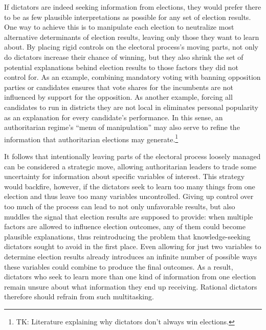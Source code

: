 \documentclass[12pt]{article}
\newcommand{\1}{\mathbbm{1}}
\begin{document}
If dictators are indeed seeking information from elections, they would prefer there to be as few plausible interpretations as possible for any set of election results. One way to achieve this is to manipulate each election to neutralize most alternative determinants of election results, leaving only those they want to learn about. By placing rigid controls on the electoral process's moving parts, not only do dictators increase their chance of winning, but they also shrink the set of potential explanations behind election results to those factors they did not control for. As an example, combining mandatory voting with banning opposition parties or candidates ensures that vote shares for the incumbents are not influenced by support for the opposition. As another example, forcing all candidates to run in districts they are not local in eliminates personal popularity as an explanation for every candidate's performance. In this sense, an authoritarian regime's ``menu of manipulation'' \citep{Schedler2002menu} may also serve to refine the information that authoritarian elections may generate.\footnote{TK: Literature explaining why dictators don't always win elections.}

It follows that intentionally leaving parts of the electoral process loosely managed can be considered a strategic move, allowing authoritarian leaders to trade some uncertainty for information about specific variables of interest. This strategy would backfire, however, if the dictators seek to learn too many things from one election and thus leave too many variables uncontrolled. Giving up control over too much of the process can lead to not only unfavorable results, but also muddles the signal that election results are supposed to provide: when multiple factors are allowed to influence election outcomes, any of them could become plausible explanations, thus reintroducing the problem that knowledge-seeking dictators sought to avoid in the first place. Even allowing for just two variables to determine election results already introduces an infinite number of possible ways these variables could combine to produce the final outcomes.  As a result, dictators who seek to learn more than one kind of information from one election remain unsure about what information they end up receiving. Rational dictators therefore should refrain from such multitasking.
\end{document}
